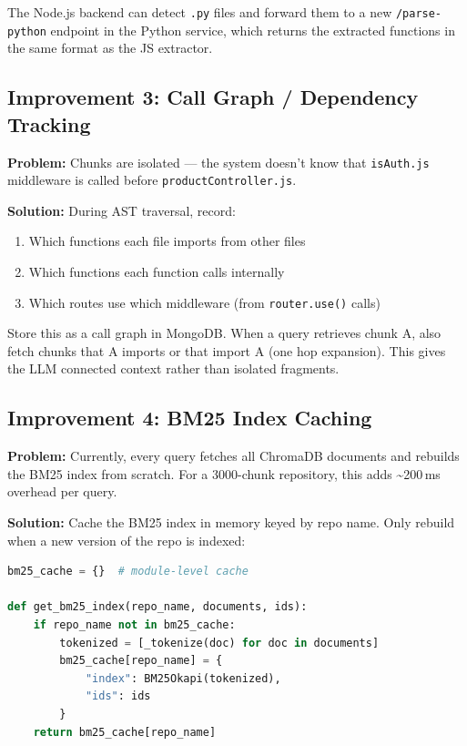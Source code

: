 \documentclass[a4paper,11pt]{article}
\begin{document}
The Node.js backend can detect \texttt{.py} files and forward them to a new \texttt{/parse-python} endpoint in the Python service, which returns the extracted functions in the same format as the JS extractor.

\subsection{Improvement 3: Call Graph / Dependency Tracking}

\textbf{Problem:} Chunks are isolated --- the system doesn't know that \texttt{isAuth.js} middleware is called before \texttt{productController.js}.

\textbf{Solution:} During AST traversal, record:
\begin{enumerate}
    \item Which functions each file imports from other files
    \item Which functions each function calls internally
    \item Which routes use which middleware (from \texttt{router.use()} calls)
\end{enumerate}

Store this as a call graph in MongoDB. When a query retrieves chunk A, also fetch chunks that A imports or that import A (one hop expansion). This gives the LLM connected context rather than isolated fragments.

\subsection{Improvement 4: BM25 Index Caching}

\textbf{Problem:} Currently, every query fetches all ChromaDB documents and rebuilds the BM25 index from scratch. For a 3000-chunk repository, this adds \textasciitilde200\,ms overhead per query.

\textbf{Solution:} Cache the BM25 index in memory keyed by repo name. Only rebuild when a new version of the repo is indexed:
\begin{lstlisting}[language=Python]
bm25_cache = {}  # module-level cache

def get_bm25_index(repo_name, documents, ids):
    if repo_name not in bm25_cache:
        tokenized = [_tokenize(doc) for doc in documents]
        bm25_cache[repo_name] = {
            "index": BM25Okapi(tokenized),
            "ids": ids
        }
    return bm25_cache[repo_name]
\end{lstlisting}
\end{document}
